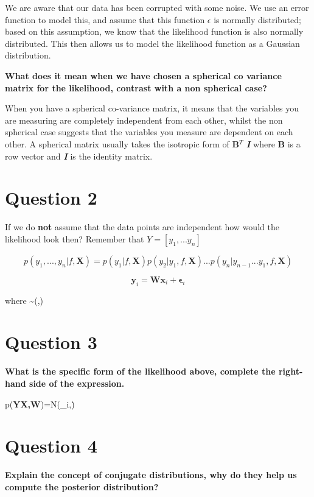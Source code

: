 \documentclass[preprint,12pt]{elsarticle}
\begin{document}
  We are aware that our data has been corrupted with some noise. We use an error function to model this, and assume that this function $\epsilon$ is normally distributed; based on this assumption, we know that the likelihood function is also normally distributed. This then allows us to model the likelihood function as a Gaussian distribution.


\textbf{What does it mean when we have chosen a spherical co variance matrix for the likelihood, contrast with a non spherical case?}

When you have a spherical co-variance matrix, it means that the variables you are measuring are completely independent from each other, whilst the non spherical case suggests that the variables you measure are dependent on each other. A spherical matrix usually takes the isotropic form of \textbf{B$^T$ \textit{I}} where \textbf{B} is a row vector and \textbf{\textit{I}} is the identity matrix.


\section{Question 2}

If we do \textbf{not} assume that the data points are independent how would the likelihood look then? Remember that $Y =[y_1,...y_n]$


\begin{equation}

p(y_1, ..., y_n|f, \textbf{X}) = p(y_1|f, \textbf{X})p(y_2|y_1,f,\textbf{X})...p(y_n|y_{n-1}...y_1, f, \textbf{X})

\end{equation}



\begin{equation}
    \textbf{y}_i= \textbf{Wx}_i + \boldsymbol{\epsilon}_i
\end{equation}

where \boldsymbol{\epsilon}  \sim {}(,)
\section{Question 3}
\textbf{What is the specific form of the likelihood above, complete the right-hand side of the expression.}

 p(\textbf{Y}\mid \textbf{X,W})={N}(_i,)\.


\section{Question 4}
\textbf{Explain the concept of conjugate distributions, why do they help us compute the posterior distribution?}
\end{document}
